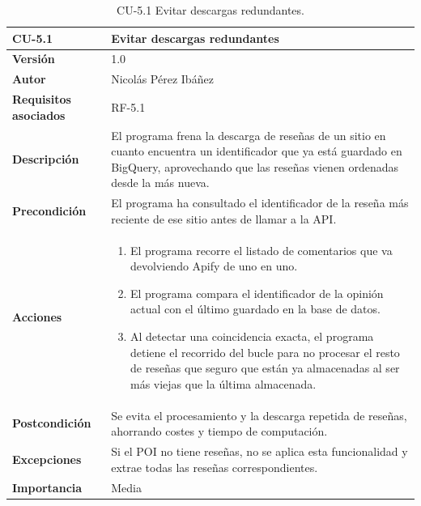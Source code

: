 \begin{table}[p]
	\centering
	\begin{tabularx}{\linewidth}{ p{} p{} }
		\toprule
		\textbf{CU-5.1}  & \textbf{Evitar descargas redundantes}\\
		\toprule
		\textbf{Versión}              & 1.0    \\
		\textbf{Autor}                & Nicolás Pérez Ibáñez \\
		\textbf{Requisitos asociados} & RF-5.1 \\
		\textbf{Descripción}          & El programa frena la descarga de reseñas de un sitio en cuanto encuentra un identificador que ya está guardado en BigQuery, aprovechando que las reseñas vienen ordenadas desde la más nueva. \\
		\textbf{Precondición}         & El programa ha consultado el identificador de la reseña más reciente de ese sitio antes de llamar a la API. \\
		\textbf{Acciones}             &
		\begin{enumerate}
			\def\labelenumi{\arabic{enumi}.}
			\tightlist
			\item El programa recorre el listado de comentarios que va devolviendo Apify de uno en uno.
			\item El programa compara el identificador de la opinión actual con el último guardado en la base de datos.
			\item Al detectar una coincidencia exacta, el programa detiene el recorrido del bucle para no procesar el resto de reseñas que seguro que están ya almacenadas al ser más viejas que la última almacenada.
		\end{enumerate}\\
		\textbf{Postcondición}        & Se evita el procesamiento y la descarga repetida de reseñas, ahorrando costes y tiempo de computación. \\
		\textbf{Excepciones}          & Si el POI no tiene reseñas, no se aplica esta funcionalidad y extrae todas las reseñas correspondientes. \\
		\textbf{Importancia}          & Media \\
		\bottomrule
	\end{tabularx}
	\caption{CU-5.1 Evitar descargas redundantes.}
\end{table}

